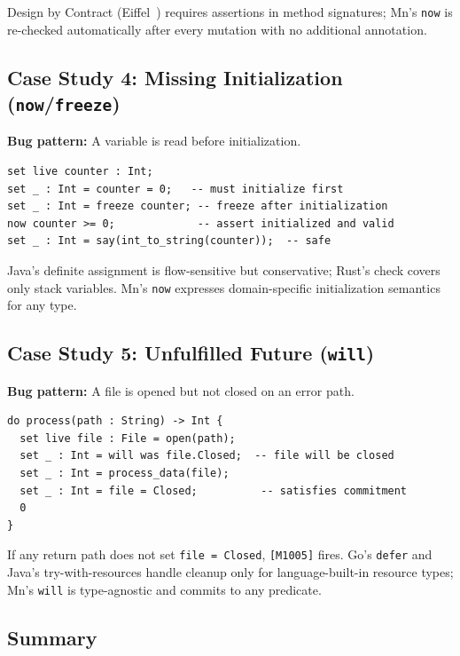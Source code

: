 \documentclass[11pt,a4paper]{article}
\begin{document}
Design by Contract (Eiffel~\cite{meyer1992}) requires assertions in method signatures; Mn's
\texttt{now} is re-checked automatically after every mutation with no additional annotation.

\subsection{Case Study 4: Missing Initialization (\texttt{now}/\texttt{freeze})}

\textbf{Bug pattern:} A variable is read before initialization.

\begin{lstlisting}[style=Mn,numbers=none]
set live counter : Int;
set _ : Int = counter = 0;   -- must initialize first
set _ : Int = freeze counter; -- freeze after initialization
now counter >= 0;             -- assert initialized and valid
set _ : Int = say(int_to_string(counter));  -- safe
\end{lstlisting}

Java's definite assignment is flow-sensitive but conservative; Rust's check covers only stack
variables. Mn's \texttt{now} expresses domain-specific initialization semantics for any type.

\subsection{Case Study 5: Unfulfilled Future (\texttt{will})}

\textbf{Bug pattern:} A file is opened but not closed on an error path.

\begin{lstlisting}[style=Mn,numbers=none]
do process(path : String) -> Int {
  set live file : File = open(path);
  set _ : Int = will was file.Closed;  -- file will be closed
  set _ : Int = process_data(file);
  set _ : Int = file = Closed;          -- satisfies commitment
  0
}
\end{lstlisting}

If any return path does not set \texttt{file = Closed}, \texttt{[M1005]} fires. Go's
\texttt{defer} and Java's try-with-resources handle cleanup only for language-built-in resource
types; Mn's \texttt{will} is type-agnostic and commits to any predicate.

\subsection{Summary}
\end{document}
